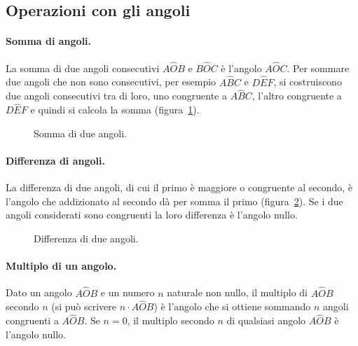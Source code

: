 \subsection{Operazioni con gli angoli}

\paragraph{Somma di angoli.} La somma di due angoli consecutivi 
\(A\widehat{O}B\) e \(B\widehat{O}C\) è l'angolo \(A\widehat{O}C\). Per 
sommare due angoli che non sono consecutivi, per esempio 
\(A\widehat{B}C\) e \(D\widehat{E}F\), si costruiscono due angoli 
consecutivi tra di loro, uno congruente a \(A\widehat{B}C\), l'altro 
congruente a \(D\widehat{E}F\) e quindi si calcola la somma 
(figura~\ref{fig:1.32}).


\begin{inaccessibleblock}
 \begin{figure}[htb]
\centering
\caption{Somma di due angoli.}\label{fig:1.32}
\end{figure}
\end{inaccessibleblock}

\paragraph{Differenza di angoli.} La differenza di due angoli, di cui 
il primo è maggiore o congruente al secondo, è l'angolo che 
addizionato al secondo dà per somma il primo (figura~\ref{fig:1.33}). 
Se i due angoli considerati sono congruenti la loro differenza è 
l'angolo nullo.


\begin{inaccessibleblock}
 \begin{figure}[htb]
\centering
\caption{Differenza di due angoli.}\label{fig:1.33}
\end{figure}
\end{inaccessibleblock}

\paragraph{Multiplo di un angolo.} Dato un angolo \(A\widehat{O}B\) e 
un numero \(n\) naturale non nullo, il multiplo di \(A\widehat{O}B\) 
secondo \(n\) (si può scrivere \(n\cdot A\widehat{O}B\)) è l'angolo che 
si ottiene sommando \(n\) angoli congruenti a \(A\widehat{O}B\). Se 
\(n=0\), il multiplo secondo \(n\) di qualsiasi angolo \(A\widehat{O}B\) è 
l'angolo nullo.


